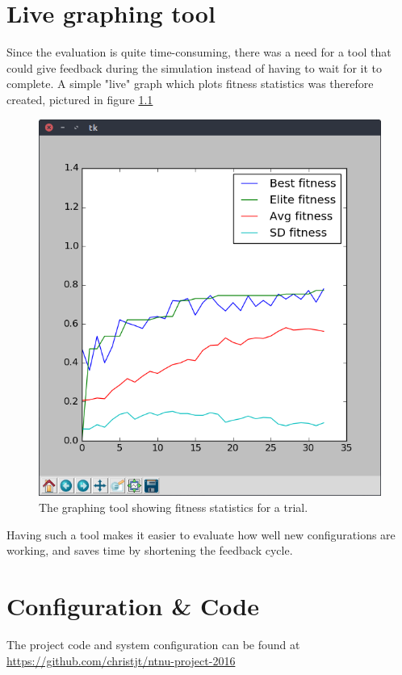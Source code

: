 \chapter{Live graphing tool}
Since the evaluation is quite time-consuming, there was a need for a tool that could give feedback during the simulation instead of having to wait for it to complete.
A simple "live" graph which plots fitness statistics was therefore created, pictured in figure \ref{fig:live-graph}
\begin{figure}[H]
	\centering
	\includegraphics[scale=0.5]{chapters/res/graph-tool.png}
	\caption{The graphing tool showing fitness statistics for a trial.}
	\label{fig:live-graph}
\end{figure}

Having such a tool makes it easier to evaluate how well new configurations are working, and saves time by shortening the feedback cycle.


\chapter{Configuration \&  Code}

The project code and system configuration can be found at \url{https://github.com/christjt/ntnu-project-2016}




